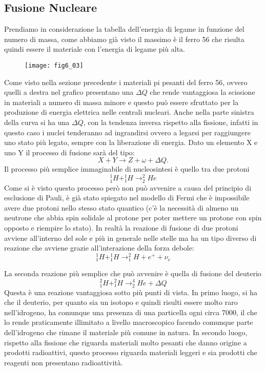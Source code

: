 \subsection{Fusione Nucleare}
Prendiamo in considerazione la tabella dell'energia di legame in funzione del numero di massa, come abbiamo già visto il massimo è il ferro 56 che risulta quindi essere il materiale con l'energia di legame più alta.
\begin{figure}[!h]
\centering
\texttt{[image: fig6\_03]}
\end{figure}

Come visto nella sezione precedente i materiali pi pesanti del ferro 56, ovvero quelli a destra nel grafico presentano una $\Delta Q$ che rende vantaggiosa la scissione in materiali a numero di massa minore e questo può essere sfruttato per la produzione di energia elettrica nelle centrali nucleari.
Anche nella parte sinistra della curva si ha una $\Delta Q$, con la tendenza inversa rispetto alla fissione, infatti in questo caso i nuclei tenderanno ad ingrandirsi ovvero a legarsi per raggiungere uno stato più legato, sempre con la liberazione di energia.
Dato un elemento X e uno Y il processo di fusione sarà del tipo:
\[
X+Y\longrightarrow Z+\omega+\Delta Q.
\]
Il processo più semplice immaginabile di nucleosintesi è quello tra due protoni
\[
^1_1H+^1_1H\longrightarrow ^2_2He
\]
Come si è visto questo processo però non può avvenire a causa del principio di esclusione di Pauli, è già stato spiegato nel modello di Fermi che è impossibile avere due protoni nello stesso stato quantico (c'è la necessità di almeno un neutrone che abbia spin solidale al protone per poter mettere un protone con spin opposto e riempire lo stato).
In realtà la reazione di fusione di due protoni avviene all'interno del sole e più in generale nelle stelle ma ha un tipo diverso di reazione che avviene grazie all'interazione della forza debole:
\begin{equation}
^1_1H+^1_1H\longrightarrow ^2_1H+e^++\nu_e
\end{equation}

La seconda reazione più semplice che può avvenire è quella di fusione del deuterio
\begin{equation}
^2_1H+^2_1H\longrightarrow ^4_2He+\Delta Q
\end{equation}
Questa è una reazione vantaggiosa sotto più punti di vista.
In primo luogo, si ha che il deuterio, per quanto sia un isotopo e quindi risulti essere molto raro nell'idrogeno, ha comunque una presenza di una particella ogni circa 7000, il che lo rende praticamente illimitato a livello macroscopico facendo comunque parte dell'idrogeno che rimane il materiale più comune in natura.
In secondo luogo, rispetto alla fissione che riguarda materiali molto pesanti che danno origine a prodotti radioattivi, questo processo riguarda materiali leggeri e sia prodotti che reagenti non presentano radioattività.

